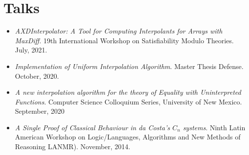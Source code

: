 \section{Talks}
\begin{itemize}

  \item \emph{AXDInterpolator: A Tool for Computing Interpolants for Arrays with MaxDiff}. 19th International Workshop  on Satisfiability Modulo Theories. July, 2021.
  \item \emph{Implementation of Uniform Interpolation Algorithm}. Master Thesis Defense. October, 2020.
  \item \emph{A new interpolation algorithm for the theory of Equality with Uninterpreted Functions}. Computer Science Colloquium Series, University of New Mexico. September, 2020
  \item \emph{A Single Proof of Classical Behaviour in da Costa's $C_n$ systems}. Ninth Latin American Workshop on 
    Logic/Languages, Algorithms and New 
    Methods of Reasoning LANMR). November, 2014.
\end{itemize}
